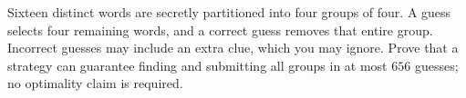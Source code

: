 Sixteen distinct words are secretly partitioned into four groups of four. A guess selects four remaining words, and a correct guess removes that entire group. Incorrect guesses may include an extra clue, which you may ignore. Prove that a strategy can guarantee finding and submitting all groups in at most $656$ guesses; no optimality claim is required.
